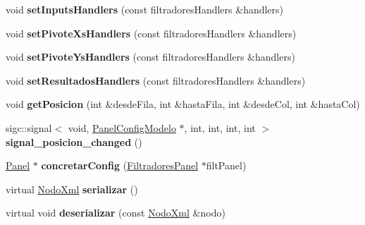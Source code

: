 \begin{DoxyCompactItemize}
\item 
\hypertarget{classPanelConfigModelo_acee78ee197e593807bba82616e2d517a}{void {\bfseries set\-Inputs\-Handlers} (const filtradores\-Handlers \&handlers)}\label{classPanelConfigModelo_acee78ee197e593807bba82616e2d517a}

\item 
\hypertarget{classPanelConfigModelo_a074528361c531696e3f4e4dacd45b196}{void {\bfseries set\-Pivote\-Xs\-Handlers} (const filtradores\-Handlers \&handlers)}\label{classPanelConfigModelo_a074528361c531696e3f4e4dacd45b196}

\item 
\hypertarget{classPanelConfigModelo_a7d4eb8fc4bfd451123ae9a7f1505d377}{void {\bfseries set\-Pivote\-Ys\-Handlers} (const filtradores\-Handlers \&handlers)}\label{classPanelConfigModelo_a7d4eb8fc4bfd451123ae9a7f1505d377}

\item 
\hypertarget{classPanelConfigModelo_a51720317d2e5bdccb493e0354b28e174}{void {\bfseries set\-Resultados\-Handlers} (const filtradores\-Handlers \&handlers)}\label{classPanelConfigModelo_a51720317d2e5bdccb493e0354b28e174}

\item 
\hypertarget{classPanelConfigModelo_a39162a3267fa44354b6fdda51079cd54}{void {\bfseries get\-Posicion} (int \&desde\-Fila, int \&hasta\-Fila, int \&desde\-Col, int \&hasta\-Col)}\label{classPanelConfigModelo_a39162a3267fa44354b6fdda51079cd54}

\item 
\hypertarget{classPanelConfigModelo_ac31c5c8a464ffb215bad14b73e6f6f99}{sigc\-::signal$<$ void, \*
\hyperlink{classPanelConfigModelo}{\-Panel\-Config\-Modelo} $\ast$, int, int, \*
int, int $>$ {\bfseries signal\-\_\-posicion\-\_\-changed} ()}\label{classPanelConfigModelo_ac31c5c8a464ffb215bad14b73e6f6f99}

\item 
\hypertarget{classPanelConfigModelo_afba32582089d3bb5ac121689b36efb64}{\hyperlink{classPanel}{\-Panel} $\ast$ {\bfseries concretar\-Config} (\hyperlink{classFiltradoresPanel}{\-Filtradores\-Panel} $\ast$filt\-Panel)}\label{classPanelConfigModelo_afba32582089d3bb5ac121689b36efb64}

\item 
\hypertarget{classPanelConfigModelo_af0b826a63401e1c1e47ef2e7f2d6162a}{virtual \hyperlink{classTiXmlElement}{\-Nodo\-Xml} {\bfseries serializar} ()}\label{classPanelConfigModelo_af0b826a63401e1c1e47ef2e7f2d6162a}

\item 
\hypertarget{classPanelConfigModelo_a21dc033acbca37640841f1d76beb3abb}{virtual void {\bfseries deserializar} (const \hyperlink{classTiXmlElement}{\-Nodo\-Xml} \&nodo)}\label{classPanelConfigModelo_a21dc033acbca37640841f1d76beb3abb}

\end{DoxyCompactItemize}


